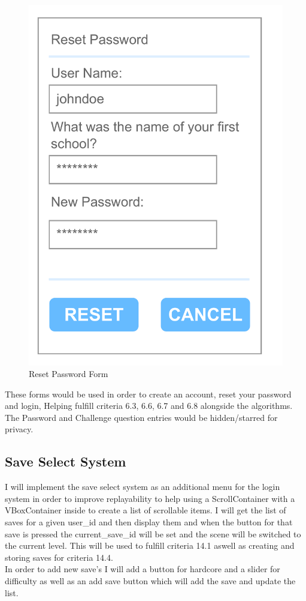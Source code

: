 \documentclass{article}
\begin{document}
\begin{multicols}{3}
\begin{figure}[H]
                        \includegraphics[width = 0.9\columnwidth]{images/design/Reset_Password.pdf}
                        \caption{Reset Password Form}
                \end{figure}
        \end{multicols}\[\]
        These forms would be used in order to create an account, reset your password and login, Helping fulfill criteria 6.3, 6.6, 6.7 and 6.8 alongside the algorithms.\\
        The Password and Challenge question entries would be hidden/starred for privacy.\\
        \newpage
        \subsection{Save Select System}
        I will implement the save select system as an additional menu for the login system in order to improve replayability to help  using a ScrollContainer with a VBoxContainer inside to create a list of scrollable items. I will get the list of saves for a given user\_id and then display them and when the button for that save is pressed the current\_save\_id will be set and the scene will be switched to the current level. This will be used to fulfill criteria 14.1 aswell as creating and storing saves for criteria 14.4.\\
        In order to add new save's I will add a button for hardcore and a slider for difficulty as well as an add save button which will add the save and update the list.\\
\end{document}
